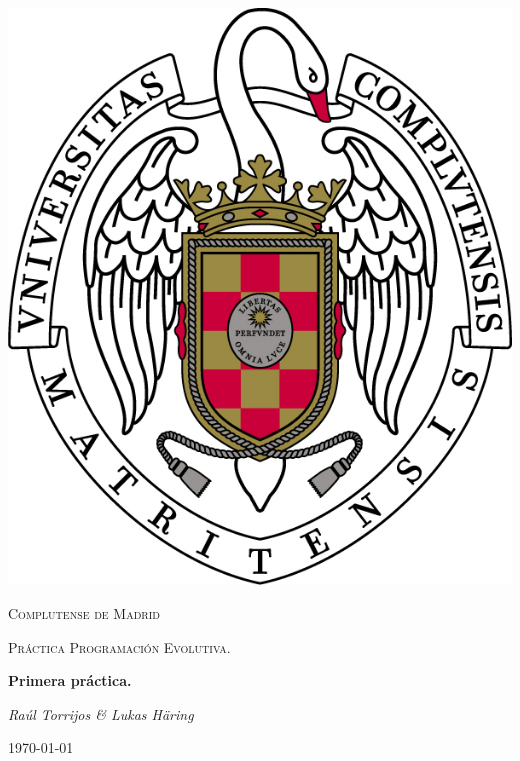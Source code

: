 \documentclass{article}
\begin{document}
\usetikzlibrary{automata,arrows, positioning}
\renewcommand{\contentsname}{Tabla de contenidos}

\begin{titlepage}
	\begin{center}
		\includegraphics{escudo.jpg}
	\end{center}
	\centering
	{\scshape\LARGE Complutense de Madrid \par}
	\vspace{1cm}
	{\scshape\Large Práctica Programación Evolutiva.\par}
	\vspace{1.5cm}
	{\huge\bfseries Primera práctica. \par}
	\vspace{2cm}
	{\Large\itshape Raúl Torrijos \& Lukas Häring\par}
	\vfill
	\vfill

	{\large \today\par}
\end{titlepage}

\tableofcontents
\end{document}
